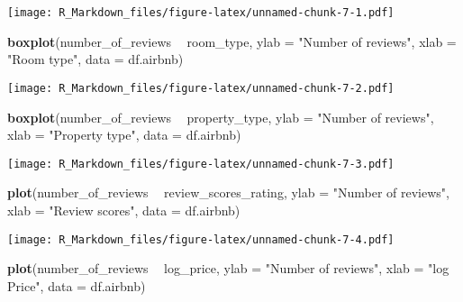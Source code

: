 \documentclass[
]{article}
\newenvironment{Shaded}{\begin{snugshade}}{\end{snugshade}}
\newcommand{\DataTypeTok}[1]{\textcolor[rgb]{0.13,0.29,0.53}{#1}}
\newcommand{\KeywordTok}[1]{\textcolor[rgb]{0.13,0.29,0.53}{\textbf{#1}}}
\newcommand{\NormalTok}[1]{#1}
\newcommand{\OperatorTok}[1]{\textcolor[rgb]{0.81,0.36,0.00}{\textbf{#1}}}
\newcommand{\StringTok}[1]{\textcolor[rgb]{0.31,0.60,0.02}{#1}}
\begin{document}
\texttt{[image: R\_Markdown\_files/figure-latex/unnamed-chunk-7-1.pdf]}

\begin{Shaded}
\begin{Highlighting}[]
\KeywordTok{boxplot}\NormalTok{(number_of_reviews }\OperatorTok{~}\StringTok{ }\NormalTok{room_type,}
        \DataTypeTok{ylab =} \StringTok{"Number of reviews"}\NormalTok{,}
        \DataTypeTok{xlab =} \StringTok{"Room type"}\NormalTok{,}
        \DataTypeTok{data =}\NormalTok{ df.airbnb)}
\end{Highlighting}
\end{Shaded}

\texttt{[image: R\_Markdown\_files/figure-latex/unnamed-chunk-7-2.pdf]}

\begin{Shaded}
\begin{Highlighting}[]
\KeywordTok{boxplot}\NormalTok{(number_of_reviews }\OperatorTok{~}\StringTok{ }\NormalTok{property_type,}
        \DataTypeTok{ylab =} \StringTok{"Number of reviews"}\NormalTok{,}
        \DataTypeTok{xlab =} \StringTok{"Property type"}\NormalTok{,}
        \DataTypeTok{data =}\NormalTok{ df.airbnb)}
\end{Highlighting}
\end{Shaded}

\texttt{[image: R\_Markdown\_files/figure-latex/unnamed-chunk-7-3.pdf]}

\begin{Shaded}
\begin{Highlighting}[]
\KeywordTok{plot}\NormalTok{(number_of_reviews }\OperatorTok{~}\StringTok{ }\NormalTok{review_scores_rating,}
        \DataTypeTok{ylab =} \StringTok{"Number of reviews"}\NormalTok{,}
        \DataTypeTok{xlab =} \StringTok{"Review scores"}\NormalTok{,}
        \DataTypeTok{data =}\NormalTok{ df.airbnb)}
\end{Highlighting}
\end{Shaded}

\texttt{[image: R\_Markdown\_files/figure-latex/unnamed-chunk-7-4.pdf]}

\begin{Shaded}
\begin{Highlighting}[]
\KeywordTok{plot}\NormalTok{(number_of_reviews }\OperatorTok{~}\StringTok{ }\NormalTok{log_price,}
        \DataTypeTok{ylab =} \StringTok{"Number of reviews"}\NormalTok{,}
        \DataTypeTok{xlab =} \StringTok{"log Price"}\NormalTok{,}
        \DataTypeTok{data =}\NormalTok{ df.airbnb)}
\end{Highlighting}
\end{Shaded}
\end{document}
